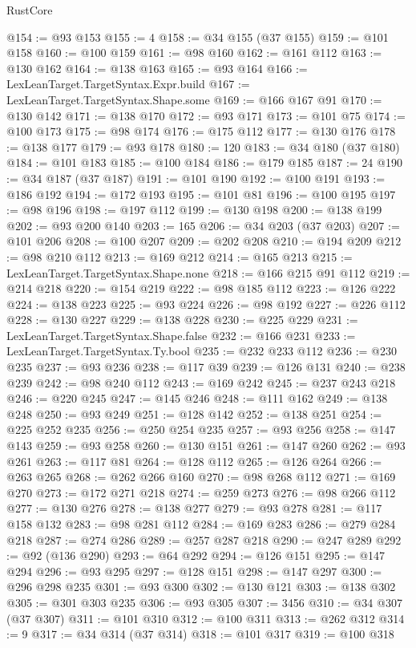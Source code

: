 \begin{lexlean}{RustCore}
\begin{coremodule}
@154 := @93 @153
@155 := 4
@158 := @34 @155 (@37 @155)
@159 := @101 @158
@160 := @100 @159
@161 := @98 @160
@162 := @161 @112
@163 := @130 @162
@164 := @138 @163
@165 := @93 @164
@166 := LexLeanTarget.TargetSyntax.Expr.build
@167 := LexLeanTarget.TargetSyntax.Shape.some
@169 := @166 @167 @91
@170 := @130 @142
@171 := @138 @170
@172 := @93 @171
@173 := @101 @75
@174 := @100 @173
@175 := @98 @174
@176 := @175 @112
@177 := @130 @176
@178 := @138 @177
@179 := @93 @178
@180 := 120
@183 := @34 @180 (@37 @180)
@184 := @101 @183
@185 := @100 @184
@186 := @179 @185
@187 := 24
@190 := @34 @187 (@37 @187)
@191 := @101 @190
@192 := @100 @191
@193 := @186 @192
@194 := @172 @193
@195 := @101 @81
@196 := @100 @195
@197 := @98 @196
@198 := @197 @112
@199 := @130 @198
@200 := @138 @199
@202 := @93 @200 @140
@203 := 165
@206 := @34 @203 (@37 @203)
@207 := @101 @206
@208 := @100 @207
@209 := @202 @208
@210 := @194 @209
@212 := @98 @210 @112
@213 := @169 @212
@214 := @165 @213
@215 := LexLeanTarget.TargetSyntax.Shape.none
@218 := @166 @215 @91 @112
@219 := @214 @218
@220 := @154 @219
@222 := @98 @185 @112
@223 := @126 @222
@224 := @138 @223
@225 := @93 @224
@226 := @98 @192
@227 := @226 @112
@228 := @130 @227
@229 := @138 @228
@230 := @225 @229
@231 := LexLeanTarget.TargetSyntax.Shape.false
@232 := @166 @231
@233 := LexLeanTarget.TargetSyntax.Ty.bool
@235 := @232 @233 @112
@236 := @230 @235
@237 := @93 @236
@238 := @117 @39
@239 := @126 @131
@240 := @238 @239
@242 := @98 @240 @112
@243 := @169 @242
@245 := @237 @243 @218
@246 := @220 @245
@247 := @145 @246
@248 := @111 @162
@249 := @138 @248
@250 := @93 @249
@251 := @128 @142
@252 := @138 @251
@254 := @225 @252 @235
@256 := @250 @254 @235
@257 := @93 @256
@258 := @147 @143
@259 := @93 @258
@260 := @130 @151
@261 := @147 @260
@262 := @93 @261
@263 := @117 @81
@264 := @128 @112
@265 := @126 @264
@266 := @263 @265
@268 := @262 @266 @160
@270 := @98 @268 @112
@271 := @169 @270
@273 := @172 @271 @218
@274 := @259 @273
@276 := @98 @266 @112
@277 := @130 @276
@278 := @138 @277
@279 := @93 @278
@281 := @117 @158 @132
@283 := @98 @281 @112
@284 := @169 @283
@286 := @279 @284 @218
@287 := @274 @286
@289 := @257 @287 @218
@290 := @247 @289
@292 := @92 (@136 @290)
@293 := @64 @292
@294 := @126 @151
@295 := @147 @294
@296 := @93 @295
@297 := @128 @151
@298 := @147 @297
@300 := @296 @298 @235
@301 := @93 @300
@302 := @130 @121
@303 := @138 @302
@305 := @301 @303 @235
@306 := @93 @305
@307 := 3456
@310 := @34 @307 (@37 @307)
@311 := @101 @310
@312 := @100 @311
@313 := @262 @312
@314 := 9
@317 := @34 @314 (@37 @314)
@318 := @101 @317
@319 := @100 @318

\end{coremodule}
\end{lexlean}
